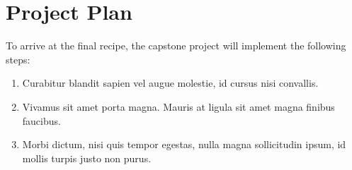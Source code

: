 \section{Project Plan}
To arrive at the final recipe, the capstone project will implement the following steps:
\begin{enumerate}
\itemsep0em 
	\item  Curabitur blandit sapien vel augue molestie, id cursus nisi convallis.
	\item Vivamus sit amet porta magna. Mauris at ligula sit amet magna finibus faucibus.
	\item Morbi dictum, nisi quis tempor egestas, nulla magna sollicitudin ipsum, id mollis turpis justo non purus.
\end{enumerate}
